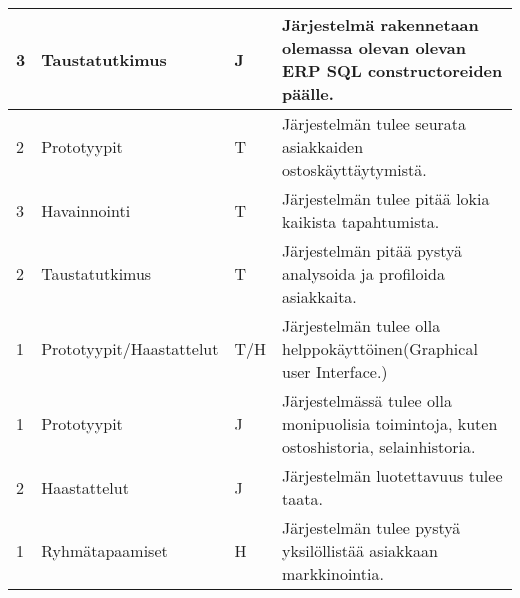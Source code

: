 \begin{landscape}
\begin{table}[]
{\begin{tabular}{llll}
    \multicolumn{1}{|l|}{3}                                            & \multicolumn{1}{l|}{Taustatutkimus}                                      & \multicolumn{1}{l|}{J}                                      & \multicolumn{1}{l|}{Järjestelmä rakennetaan olemassa olevan olevan ERP SQL constructoreiden päälle.}          \\ \hline
    \multicolumn{1}{|l|}{2}                                            & \multicolumn{1}{l|}{Prototyypit}                                      & \multicolumn{1}{l|}{T}                                      & \multicolumn{1}{l|}{Järjestelmän tulee seurata asiakkaiden ostoskäyttäytymistä.}                              \\ \hline
    \multicolumn{1}{|l|}{3}                                            & \multicolumn{1}{l|}{Havainnointi}                                      & \multicolumn{1}{l|}{T}                                      & \multicolumn{1}{l|}{Järjestelmän tulee pitää lokia kaikista tapahtumista.}                                   \\ \hline
    \multicolumn{1}{|l|}{2}                                            & \multicolumn{1}{l|}{Taustatutkimus}                                      & \multicolumn{1}{l|}{T}                                      & \multicolumn{1}{l|}{Järjestelmän pitää pystyä analysoida ja profiloida asiakkaita.}                         \\ \hline
    \multicolumn{1}{|l|}{1}                                            & \multicolumn{1}{l|}{Prototyypit/Haastattelut}                                      & \multicolumn{1}{l|}{T/H}                                    & \multicolumn{1}{l|}{Järjestelmän tulee olla helppokäyttöinen(Graphical user Interface.)}                    \\ \hline
    \multicolumn{1}{|l|}{1}                                            & \multicolumn{1}{l|}{Prototyypit}                                      & \multicolumn{1}{l|}{J}                                    & \multicolumn{1}{l|}{Järjestelmässä tulee olla monipuolisia toimintoja, kuten ostoshistoria, selainhistoria.}\\ \hline
    \multicolumn{1}{|l|}{2}                                            & \multicolumn{1}{l|}{Haastattelut}                                      & \multicolumn{1}{l|}{J}                                    & \multicolumn{1}{l|}{Järjestelmän luotettavuus tulee taata.}                                                 \\ \hline
    \multicolumn{1}{|l|}{1}                                            & \multicolumn{1}{l|}{Ryhmätapaamiset}                                      & \multicolumn{1}{l|}{H}                                    & \multicolumn{1}{l|}{Järjestelmän tulee pystyä yksilöllistää asiakkaan markkinointia.}                       \\ \hline

\end{tabular}}
\end{table}
\end{landscape}
